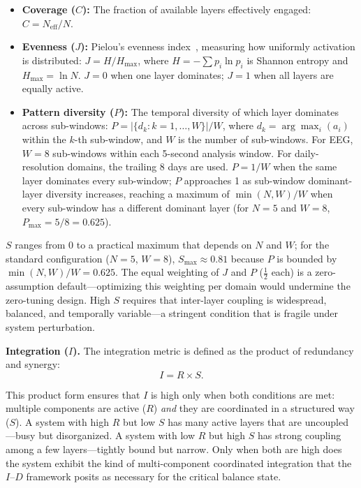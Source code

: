 \documentclass[aip,cha,reprint,amsmath,amssymb]{revtex4-2}
\begin{document}
\begin{itemize}
\item \textbf{Coverage ($C$):} The fraction of available layers effectively engaged: $C = N_{\text{eff}} / N$.

\item \textbf{Evenness ($J$):} Pielou's evenness index~\cite{pielou1966}, measuring how uniformly activation is distributed: $J = H / H_{\max}$, where $H = -\sum p_i \ln p_i$ is Shannon entropy and $H_{\max} = \ln N$. $J = 0$ when one layer dominates; $J = 1$ when all layers are equally active.

\item \textbf{Pattern diversity ($P$):} The temporal diversity of which layer dominates across sub-windows: $P = |\{d_k : k = 1, \ldots, W\}| / W$, where $d_k = \arg\max_i(a_i)$ within the $k$-th sub-window, and $W$ is the number of sub-windows. For EEG, $W = 8$ sub-windows within each 5-second analysis window. For daily-resolution domains, the trailing 8 days are used. $P = 1/W$ when the same layer dominates every sub-window; $P$ approaches 1 as sub-window dominant-layer diversity increases, reaching a maximum of $\min(N, W)/W$ when every sub-window has a different dominant layer (for $N = 5$ and $W = 8$, $P_{\max} = 5/8 = 0.625$).
\end{itemize}

$S$ ranges from 0 to a practical maximum that depends on $N$ and $W$; for the standard configuration ($N = 5$, $W = 8$), $S_{\max} \approx 0.81$ because $P$ is bounded by $\min(N, W)/W = 0.625$. The equal weighting of $J$ and $P$ ($\frac{1}{2}$ each) is a zero-assumption default---optimizing this weighting per domain would undermine the zero-tuning design. High $S$ requires that inter-layer coupling is widespread, balanced, and temporally variable---a stringent condition that is fragile under system perturbation.

\textbf{Integration ($I$).} The integration metric is defined as the product of redundancy and synergy:
\begin{equation}
I = R \times S.
\end{equation}

This product form ensures that $I$ is high only when both conditions are met: multiple components are active ($R$) \emph{and} they are coordinated in a structured way ($S$). A system with high $R$ but low $S$ has many active layers that are uncoupled---busy but disorganized. A system with low $R$ but high $S$ has strong coupling among a few layers---tightly bound but narrow. Only when both are high does the system exhibit the kind of multi-component coordinated integration that the $I$--$D$ framework posits as necessary for the critical balance state.
\end{document}
